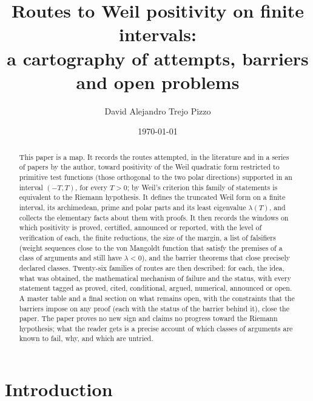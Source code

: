 \documentclass[11pt]{amsart}
\theoremstyle{definition}
\theoremstyle{remark}
\numberwithin{equation}{section}
\begin{document}
\title[Routes to Weil positivity]{Routes to Weil positivity on finite intervals:\\
a cartography of attempts, barriers and open problems}

\author{David Alejandro Trejo Pizzo}

\date{\today}

\begin{abstract}
This paper is a map. It records the routes attempted, in the literature and in a series
of papers by the author, toward positivity of the Weil quadratic form restricted to primitive test functions (those
orthogonal to the two polar directions) supported in an interval $(-T,T)$, for every $T>0$; by Weil's criterion this
family of statements is equivalent to the Riemann hypothesis. It defines the truncated Weil form on a finite
interval, its archimedean, prime and polar parts and its least eigenvalue $\lambda(T)$, and collects the elementary
facts about them with proofs. It then records the windows on which positivity is proved, certified, announced or
reported, with the level of verification of each, the finite reductions, the size of the margin, a list of falsifiers (weight sequences close to the
von Mangoldt function that satisfy the premises of a class of arguments and still have $\lambda<0$), and the barrier
theorems that close precisely declared classes. Twenty-six families of routes are then described: for each, the idea,
what was obtained, the mathematical mechanism of failure and the status, with every statement tagged as proved, cited,
conditional, argued, numerical, announced or open. A master table and a final section on what remains open, with the
constraints that the barriers impose on any proof (each with the status of the barrier behind it), close the paper. The paper proves no new sign and claims no progress toward the
Riemann hypothesis; what the reader gets is a precise account of which classes of arguments are known to fail, why,
and which are untried.
\end{abstract}

\maketitle
\tableofcontents
\section{Introduction}\label{w1:sec:intro}
\end{document}
